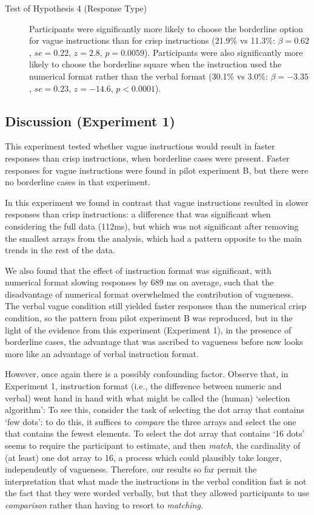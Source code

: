 \documentclass[ %
  graybox       %
 ,envcountchap  %
 ,sectrefs      %
]{svmono}
\begin{document}
\begin{description}
	\item [Test of Hypothesis 4 (Response Type)] Participants were significantly more likely to choose the borderline option for vague instructions than for crisp instructions (21.9\% vs 11.3\%: $\beta=0.62$, $se=0.22$, $z=2.8$, $p=0.0059$). Participants were also significantly more likely to choose the borderline square when the instruction used the numerical format rather than the verbal format (30.1\% vs 3.0\%: $\beta=-3.35$, $se=0.23$, $z=-14.6$, $p<0.0001$).
\end{description}

\subsection{Discussion (Experiment 1)}

This experiment tested whether vague instructions would result in faster responses than crisp instructions, when borderline cases were present. Faster responses for vague instructions were found in pilot experiment B, but there were no borderline cases in that experiment.

In this experiment we found in contrast that vague instructions resulted in slower responses than crisp instructions: a difference that was significant when considering the full data (112ms), but which was not significant after removing the smallest arrays from the analysis, which had a pattern opposite to the main trends in the rest of the data.

We also found that the effect of instruction format was significant, with numerical format slowing responses by 689 ms on average, such that the disadvantage of numerical format overwhelmed the contribution of vagueness. The verbal vague condition still yielded faster responses than the numerical crisp condition, so the pattern from pilot experiment B was reproduced, but in the light of the evidence from this experiment (Experiment 1), in the presence of borderline cases, the advantage that was ascribed to vagueness before now looks more like an advantage of verbal instruction format.

However, once again there is a possibly confounding factor. Observe that, in Experiment 1, instruction format (i.e., the difference between numeric and verbal) went hand in hand with what might be called the (human) `selection algorithm': To see this, consider the task of selecting the dot array that contains `few dots': to do this, it suffices to \emph{compare} the three arrays and select the one that contains the fewest elements.  To select the dot array that contains `16 dots' seems to require the participant to estimate, and then \emph{match}, the cardinality of (at least) one dot array to 16, a process which could plausibly take longer, independently of vagueness. Therefore, our results so far permit the interpretation that what made the instructions in the verbal condition fast is not the fact that they were worded verbally, but that they allowed participants to use \emph{comparison} rather than having to resort to \emph{matching}.
\end{document}
